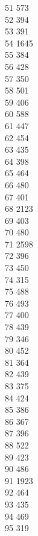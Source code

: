 { 51	573 \\
 52	394 \\
 53	391 \\
 54	1645 \\
 55	384 \\
 56	428 \\
 57	350 \\
 58	501 \\
 59	406 \\
 60	588 \\
 61	447 \\
 62	454 \\
 63	435 \\
 64	398 \\
 65	464 \\
 66	480 \\
 67	401 \\
 68	2123 \\
 69	403 \\
 70	480 \\
 71	2598 \\
 72	396 \\
 73	450 \\
 74	315 \\
 75	488 \\
 76	493 \\
 77	400 \\
 78	439 \\
 79	346 \\
 80	452 \\
 81	364 \\
 82	439 \\
 83	375 \\
 84	424 \\
 85	386 \\
 86	367 \\
 87	396 \\
 88	522 \\
 89	423 \\
 90	486 \\
 91	1923 \\
 92	464 \\
 93	435 \\
 94	469 \\
 95	319 \\
}
